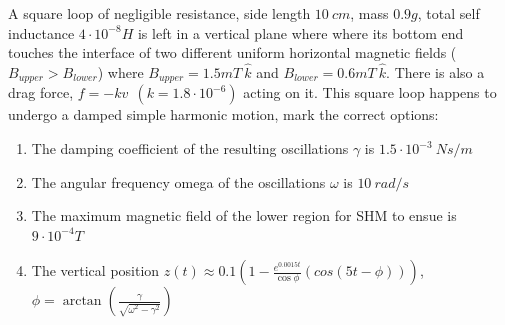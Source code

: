 \documentclass[11pt,a4paper]{scrartcl}
\begin{document}
\begin{problem}
 
A square loop of negligible resistance, side length $10\ cm$, mass $0.9g$, total self inductance $4\cdot 10^{-8} H$ is left in a vertical plane where where its bottom end touches the interface of two different uniform horizontal magnetic fields ($B_{upper}>B_{lower}$) where $B_{upper}=1.5mT\ \hat{k}$ and $B_{lower}=0.6mT\ \hat{k}$. There is also a drag force, $f=-kv\ \ (k=1.8\cdot10^{-6})$ acting on it. This square loop happens to undergo a damped simple harmonic motion, mark the correct options:
\begin{enumerate}[label=\Alph*]
\item The damping coefficient of the resulting oscillations $\gamma$ is $1.5\cdot 10^{-3}\ Ns/m$
\item The angular frequency omega of the oscillations $\omega$ is  $10\ rad/s$
\item The maximum magnetic field of the lower region for SHM to ensue is $9\cdot 10^{-4} T$
\item The vertical position $z(t)\approx 0.1\left(1-\frac{e^{0.0015t}}{\cos \phi}\left(cos\left(5t-\phi\right)\right)\right)$, $\phi=\arctan(\frac{\gamma}{\sqrt{\omega^2-\gamma^2}})$ \newline \newline 

\end{enumerate}



\begin{center}
    


\begin{tikzpicture}[x=0.75pt,y=0.75pt,yscale=-1,xscale=1]


\end{tikzpicture}
\end{center}
\end{problem}
\end{document}

